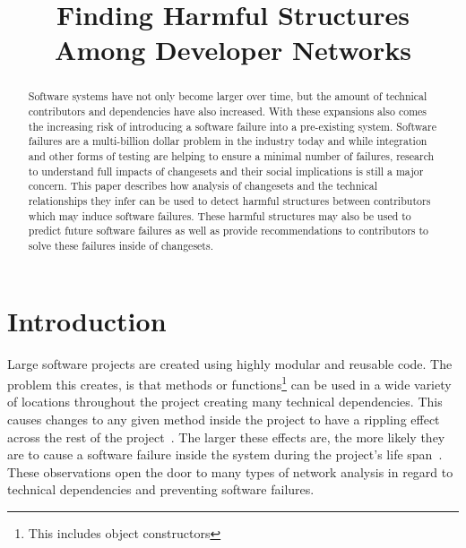 \documentclass[conference]{IEEEtran}
\begin{document}
\title{Finding Harmful Structures Among Developer Networks}

\author{
}

\maketitle


\begin{abstract}
Software systems have not only become larger over time, but the amount of
technical contributors and dependencies have also increased. With these expansions also comes
the increasing risk of introducing a software failure into a pre-existing system.
Software failures are a multi-billion dollar problem in the industry today and while integration and
other forms of testing are helping to ensure a minimal number of failures, research to understand
full impacts of changesets and their social implications is still a major concern. This paper describes
how analysis of changesets and the technical relationships they infer can be used to detect harmful
structures between contributors which may induce software failures. These harmful structures may
also be used to predict future software failures as well as provide recommendations to contributors
to solve these failures inside of changesets.
\end{abstract}


\section{Introduction}

Large software projects are created using highly modular and 
reusable code. The problem this creates, is that methods or functions\footnote{This includes object constructors} 
can be used in a wide variety of locations throughout the project creating many technical 
dependencies.  This causes changes to any given method inside the project to have a rippling 
effect across the rest of the project~\cite{Acharya:2011:PCI}. The larger these effects are,
the more likely they are to cause a software failure inside the system during the project's
life span~\cite{Zimmermann:2008:PDU}. These observations open the door to many types
of network analysis in regard to technical dependencies and preventing software failures.
\end{document}
